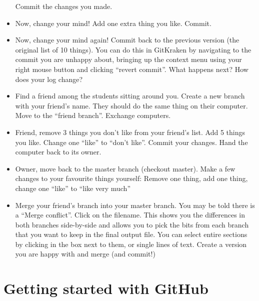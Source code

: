 \documentclass[pdflatex,a4paper]{article}
\begin{document}
\begin{itemize}
Commit the changes you made. 
\item
Now, change your mind! Add one extra thing you like. Commit. 
\item
Now, change your mind again! Commit back to the previous version (the original list of 10 things). You can do this in GitKraken by navigating to the commit you are unhappy about, bringing up the context menu using your right mouse button and clicking ``revert commit''. What happens next? How does your log change?
\item
Find a friend among the students sitting around you. Create a new branch with your friend's name. They should do the same thing on their computer. Move to the ``friend branch''. Exchange computers.
\item
Friend, remove 3 things you don't like from your friend's list. Add 5 things you like. Change one ``like'' to ``don't like''. Commit your changes. Hand the computer back to its owner.
\item
Owner, move back to the master branch (checkout master). Make a few changes to your favourite things yourself: Remove one thing, add one thing, change one ``like'' to ``like very much''
\item
 Merge your friend's branch into your master branch. You may be told there is a ``Merge conflict''. Click on the filename. This shows you the differences in both branches side-by-side and allows you to pick the bits from each branch that you want to keep in the final output file. You can select entire sections by clicking in the box next to them, or single lines of text. Create a version you are happy with and merge (and commit!)
\end{itemize}

\section{Getting started with GitHub}
\end{document}
